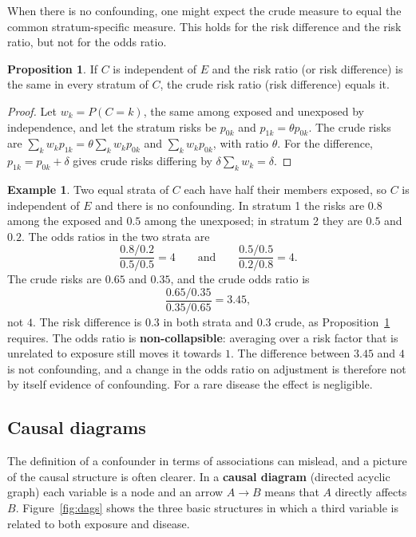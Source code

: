 \documentclass[11pt,a4paper]{article}
\numberwithin{equation}{section}
\theoremstyle{definition}
\newtheorem{exa}[thm]{Example}
\newtheorem{prop}[thm]{Proposition}
\begin{document}
When there is no confounding, one might expect the crude measure to equal the common stratum-specific measure. This holds for the
risk difference and the risk ratio, but not for the odds ratio.

\begin{prop}
\label{prop:collapse}
If $C$ is independent of $E$ and the risk ratio (or risk difference) is the same in every stratum of $C$, the crude risk ratio (risk difference)
equals it.
\end{prop}

\begin{proof}
Let $w_k = P(C = k)$, the same among exposed and unexposed by independence, and let the stratum risks be $p_{0k}$ and $p_{1k} = \theta p_{0k}$. The crude
risks are $\sum_k w_k p_{1k} = \theta\sum_k w_k p_{0k}$ and $\sum_k w_k p_{0k}$, with ratio $\theta$. For the difference, $p_{1k} = p_{0k} + \delta$ gives crude risks differing by
$\delta\sum_k w_k = \delta$.
\end{proof}

\begin{exa}
\label{exa:noncollapse}
Two equal strata of $C$ each have half their members exposed, so $C$ is independent of $E$ and there is no
confounding. In stratum 1 the risks are $0.8$ among the exposed and $0.5$ among the unexposed; in stratum 2 they are $0.5$ and $0.2$.
The odds ratios in the two strata are
\[
\frac{0.8/0.2}{0.5/0.5} = 4 \qquad\text{and}\qquad \frac{0.5/0.5}{0.2/0.8} = 4 .
\]
The crude risks are $0.65$ and $0.35$, and the crude odds ratio is
\[
\frac{0.65/0.35}{0.35/0.65} = 3.45 ,
\]
not $4$. The risk difference is $0.3$ in both strata and $0.3$ crude, as Proposition~\ref{prop:collapse} requires. The odds ratio is
\textbf{non-collapsible}: averaging over a risk factor that is unrelated to exposure still moves it towards $1$. The difference between
$3.45$ and $4$ is not confounding, and a change in the odds ratio on adjustment is therefore not by itself evidence of confounding. For a
rare disease the effect is negligible.
\end{exa}

\subsection{Causal diagrams}
\label{sec:dags}

The definition of a confounder in terms of associations can mislead, and a picture of the causal structure is often clearer. In a
\textbf{causal diagram} (directed acyclic graph) each variable is a node and an arrow $A \to B$ means that $A$ directly affects $B$.
Figure~\ref{fig:dags} shows the three basic structures in which a third variable is related to both exposure and disease.
\end{document}

